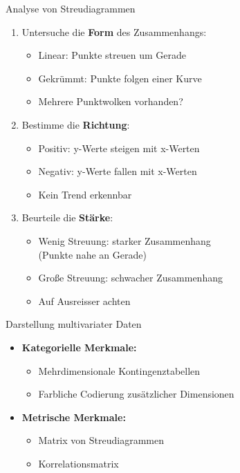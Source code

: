 \begin{KR}{Analyse von Streudiagrammen}
\begin{enumerate}
    \item Untersuche die \textbf{Form} des Zusammenhangs:
    \begin{itemize}
        \item Linear: Punkte streuen um Gerade
        \item Gekrümmt: Punkte folgen einer Kurve
        \item Mehrere Punktwolken vorhanden?
    \end{itemize}
    \item Bestimme die \textbf{Richtung}:
    \begin{itemize}
        \item Positiv: y-Werte steigen mit x-Werten
        \item Negativ: y-Werte fallen mit x-Werten
        \item Kein Trend erkennbar
    \end{itemize}
    \item Beurteile die \textbf{Stärke}:
    \begin{itemize}
        \item Wenig Streuung: starker Zusammenhang \\(Punkte nahe an Gerade)
        \item Große Streuung: schwacher Zusammenhang
        \item Auf Ausreisser achten
    \end{itemize}
\end{enumerate}
\end{KR}

\begin{concept}{Darstellung multivariater Daten}
\begin{itemize}
    \item \textbf{Kategorielle Merkmale:}
    \begin{itemize}
        \item Mehrdimensionale Kontingenztabellen
        \item Farbliche Codierung zusätzlicher Dimensionen
    \end{itemize}
    \item \textbf{Metrische Merkmale:}
    \begin{itemize}
        \item Matrix von Streudiagrammen
        \item Korrelationsmatrix
    \end{itemize}
\end{itemize}
\end{concept}

